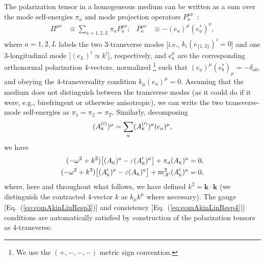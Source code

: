 \documentclass[amsmath,amssymb,aps,10pt,prd,letterpaper,nofootinbib,balancelastpage,notitlepage,superscriptaddress,twocolumn,floatfix]{revtex4-2}
\renewcommand{\eqref}[2][]{Eq{#1}.~(\ref{eq:#2})}	%
\newcommand{\kin}[1]{({#1}_{\textsc{k}})}
\newcommand{\primekin}[1]{({#1}_{\textsc{k}}^\prime)}
\begin{document}
The polarization tensor in a homogeneous medium can be written as a sum over the mode self-energies $\pi_a$ and mode projection operators $P_a^{\mu\nu}$~\cite{Raffelt:1996wa}:
\begin{align}
    \Pi^{\mu\nu} &\equiv \sum_{a=1,2,L} \pi_a P_a^{\mu\nu}; &
    P_a^{\mu\nu} &\equiv - (e_a)^\mu (e_a^{*})^{\nu},
\end{align}
where $a=1,2,L$ labels the two 3-transverse modes [i.e., $k_i (e_{\{1,2\}})^i =0$] and one 3-longitudinal mode [$(e_L)^i \propto k^i$], respectively, and $e_a^\mu$ are the corresponding orthonormal polarization 4-vectors, normalized%
\footnote{\label{ftnt:metricSignature}%
    We use the $(+,-,-,-)$ metric sign convention.
} %
such that $(e_a)^\mu (e^*_{b})_{\mu} = -\delta_{ab}$, and obeying the 4-transversality condition $k_\mu (e_a)^\mu = 0$.
Assuming that the medium does not distinguish between the transverse modes (as it could do if it were, e.g., birefringent or otherwise anisotropic), we can write the two transverse-mode self-energies as $\pi_1=\pi_2 = \pi_T$.
Similarly, decomposing
\begin{align}
    (A^{(\prime)}_{\textsc{k}})^\mu = \sum_a (A^{(\prime)}_{\textsc{k}})^a(e_a)^\mu,
\end{align}
we have
\begin{align}
    (-\omega^2+k^2) \big[ \kin{A}^{a} - \varepsilon \primekin{A}^{a} \big] + \pi_a \kin{A}^a &=0,  \label{eq:eigenEqn1} \\
    (-\omega^2+k^2) \big[ \primekin{A}^{a} - \varepsilon \kin{A}^{a} \big] + m_{A'}^2 \primekin{A}^{a} &= 0,   \label{eq:eigenEqn2}
\end{align}
where, here and throughout what follows, we have defined $k^2 = \bm{k}\cdot \bm{k}$ (we distinguish the contracted 4-vector $k$ as $k_\mu k^\mu$ where necessary).
The gauge [\eqref{eomAkinLinResp3}] and consistency [\eqref{eomAkinLinResp4}] conditions are automatically satisfied by construction of the polarization tensors as 4-transverse.
\end{document}
